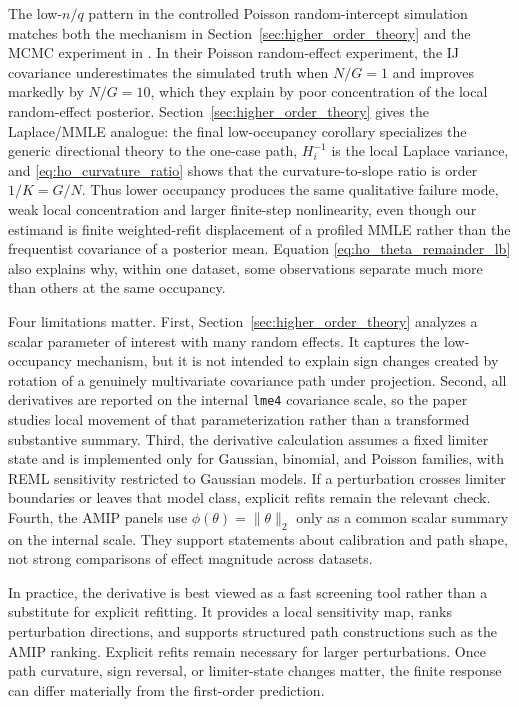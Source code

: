 The low-\(n/q\) pattern in the controlled Poisson random-intercept simulation matches both the mechanism in Section~\ref{sec:higher_order_theory} and the MCMC experiment in \citet[Sec.~4.1]{GiordanoBroderick2024BayesIJVariance}. In their Poisson random-effect experiment, the IJ covariance underestimates the simulated truth when \(N/G=1\) and improves markedly by \(N/G=10\), which they explain by poor concentration of the local random-effect posterior. Section~\ref{sec:higher_order_theory} gives the Laplace/MMLE analogue: the final low-occupancy corollary specializes the generic directional theory to the one-case path, \(H_i^{-1}\) is the local Laplace variance, and \eqref{eq:ho_curvature_ratio} shows that the curvature-to-slope ratio is order \(1/K = G/N\). Thus lower occupancy produces the same qualitative failure mode, weak local concentration and larger finite-step nonlinearity, even though our estimand is finite weighted-refit displacement of a profiled MMLE rather than the frequentist covariance of a posterior mean. Equation \eqref{eq:ho_theta_remainder_lb} also explains why, within one dataset, some observations separate much more than others at the same occupancy.

Four limitations matter. First, Section~\ref{sec:higher_order_theory} analyzes a scalar parameter of interest with many random effects. It captures the low-occupancy mechanism, but it is not intended to explain sign changes created by rotation of a genuinely multivariate covariance path under projection. Second, all derivatives are reported on the internal \texttt{lme4} covariance scale, so the paper studies local movement of that parameterization rather than a transformed substantive summary. Third, the derivative calculation assumes a fixed limiter state and is implemented only for Gaussian, binomial, and Poisson families, with REML sensitivity restricted to Gaussian models. If a perturbation crosses limiter boundaries or leaves that model class, explicit refits remain the relevant check. Fourth, the AMIP panels use \(\phi(\theta)=\|\theta\|_2\) only as a common scalar summary on the internal scale. They support statements about calibration and path shape, not strong comparisons of effect magnitude across datasets.

In practice, the derivative is best viewed as a fast screening tool rather than a substitute for explicit refitting. It provides a local sensitivity map, ranks perturbation directions, and supports structured path constructions such as the AMIP ranking. Explicit refits remain necessary for larger perturbations. Once path curvature, sign reversal, or limiter-state changes matter, the finite response can differ materially from the first-order prediction.
